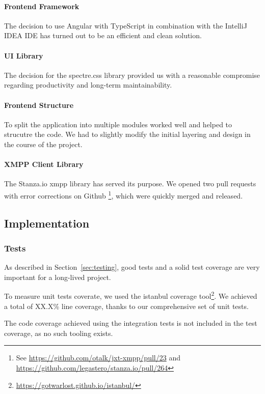 \paragraph{Frontend Framework}
The decision to use Angular with TypeScript in combination with the IntelliJ IDEA IDE has turned out to be an efficient and clean solution.

\paragraph{UI Library}
The decision for the spectre.css library provided us with a reasonable compromise regarding productivity and long-term maintainability.

\paragraph{Frontend Structure}
To split the application into multiple modules worked well and helped to strucutre the code.
We had to slightly modify the initial layering and design in the course of the project.

\paragraph{XMPP Client Library}
The Stanza.io \gls{xmpp} library has served its purpose.
We opened two pull requests with error corrections on Github \footnote{See \url{https://github.com/otalk/jxt-xmpp/pull/23} and \url{https://github.com/legastero/stanza.io/pull/264}}, which were quickly merged and released.

\subsection{Implementation}

\subsubsection{Tests}
As described in Section~\ref{sec:testing}, good tests and a solid test coverage are very important for a long-lived project.

To measure unit tests coverate, we used the istanbul coverage tool\footnote{\url{https://gotwarlost.github.io/istanbul/}}. We achieved a total of XX.X\% line coverage, thanks to our comprehensive set of unit tests. %

The code coverage achieved using the integration tests is not included in the test coverage, as no such tooling exists.


